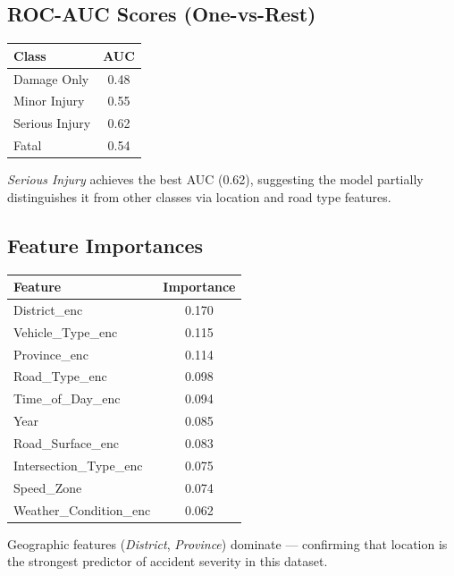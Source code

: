 \documentclass[12pt,a4paper]{article}
\begin{document}
\subsection{ROC-AUC Scores (One-vs-Rest)}

\begin{center}
\begin{tabular}{lc}
\toprule
\textbf{Class} & \textbf{AUC} \\
\midrule
Damage Only    & 0.48 \\
Minor Injury   & 0.55 \\
Serious Injury & 0.62 \\
Fatal          & 0.54 \\
\bottomrule
\end{tabular}
\end{center}

\textit{Serious Injury} achieves the best AUC (0.62), suggesting the model partially distinguishes it from other classes via location and road type features.

\subsection{Feature Importances}

\begin{center}
\begin{tabular}{lc}
\toprule
\textbf{Feature} & \textbf{Importance} \\
\midrule
District\_enc           & 0.170 \\
Vehicle\_Type\_enc      & 0.115 \\
Province\_enc           & 0.114 \\
Road\_Type\_enc         & 0.098 \\
Time\_of\_Day\_enc      & 0.094 \\
Year                    & 0.085 \\
Road\_Surface\_enc      & 0.083 \\
Intersection\_Type\_enc & 0.075 \\
Speed\_Zone             & 0.074 \\
Weather\_Condition\_enc & 0.062 \\
\bottomrule
\end{tabular}
\end{center}

Geographic features (\textit{District}, \textit{Province}) dominate — confirming that location is the strongest predictor of accident severity in this dataset.
\end{document}
